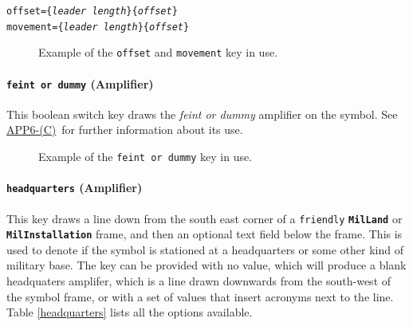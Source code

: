\documentclass[a4paper, titlepage]{article}
\newcommand\DocLink{\href{https://www.awl.edu.pl/images/en/APP_6_C.pdf}{APP6-(C)}}
\begin{document}
\texttt{offset=\{\textit{leader length}\}\{\textit{offset}\}}\\
\indent\texttt{movement=\{\textit{leader length}\}\{\textit{offset}\}}

\begin{figure}[H]
\centering
{}
\caption{Example of the \texttt{offset} and \texttt{movement}  key in use.}
\end{figure}

\paragraph{\texttt{feint or dummy} (Amplifier)}

This boolean switch key draws the \textit{feint or dummy} amplifier on the symbol. See \DocLink\ for further information about its use.

 \begin{figure}[H]
\centering
{}
\caption{Example of the \texttt{feint or dummy} key in use.}
\end{figure}

\paragraph{\texttt{headquarters} (Amplifier)}

This key draws a line down from the south east corner of a \texttt{friendly} \textbf{\texttt{MilLand}} or \textbf{\texttt{MilInstallation}} frame, and then an optional text field below the frame. This is used to denote if the symbol is stationed at a headquarters or some other kind of military base. The key can be provided with no value, which will produce a blank headquaters amplifer, which is a line drawn downwards from the south-west of the symbol frame, or with a set of values that insert acronyms next to the line. Table \ref{headquarters} lists all the options available.
\end{document}
